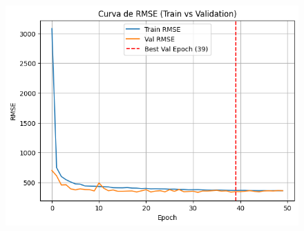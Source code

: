 \begin{figure}[H]
\begin{minipage}{0.48\textwidth}
		\vspace{0.2cm}
		\includegraphics[width=\linewidth]{includes/cap5/graphs/sid5_mlp_rmse.png}
	\end{minipage}
	\label{fig:curvas_sid5_mlp}
\end{figure}


